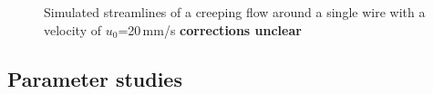   \begin{figure}[H]
\centering

\caption[Simulated Stokes flow around cylinder]{Simulated streamlines of a creeping flow around a single wire with a velocity of $u_{0}$=20\,mm/s \textbf{corrections unclear} 
\label{fig:creep_flow_sw}
}
\end{figure}

\subsection{Parameter studies}
\label{subsec:Param_res}

